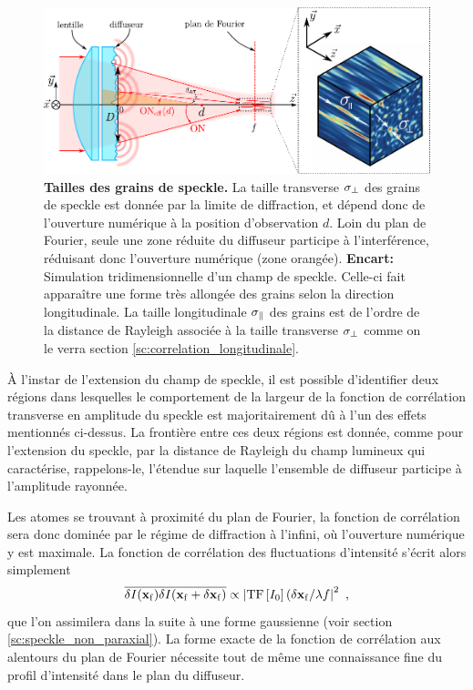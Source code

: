 \begin{figure}
\centering
\includegraphics[width=\textwidth]{Fig/Speckle/correlation_speckle.pdf}
\caption{\textbf{Tailles des grains de speckle.} La taille transverse $\sigma_{\perp}$ des grains de speckle est donnée par la limite de diffraction, et dépend donc de l'ouverture numérique à la position d'observation $d$. Loin du plan de Fourier, seule une zone réduite du diffuseur participe à l'interférence, réduisant donc l'ouverture numérique (zone orangée). \textbf{Encart:} Simulation tridimensionnelle d'un champ de speckle. Celle-ci fait apparaître une forme très allongée des grains selon la direction longitudinale. La taille longitudinale $\sigma_{\parallel}$ des grains est de l'ordre de la distance de Rayleigh associée à la taille transverse $\sigma_{\perp}$ comme on le verra section \ref{sc:correlation_longitudinale}.}
\label{fig:correlation_speckle}
\end{figure}

À l'instar de l'extension du champ de speckle, il est possible d'identifier deux régions dans lesquelles le comportement de la largeur de la fonction de corrélation transverse en amplitude du speckle est majoritairement dû à l'un des effets mentionnés ci-dessus. La frontière entre ces deux régions est donnée, comme pour l'extension du speckle, par la distance de Rayleigh du champ lumineux qui caractérise, rappelons-le, l'étendue sur laquelle l'ensemble de diffuseur participe à l'amplitude rayonnée.

Les atomes se trouvant à proximité du plan de Fourier, la fonction de corrélation sera donc dominée par le régime de diffraction à l'infini, où l'ouverture numérique y est maximale. La fonction de corrélation des fluctuations d'intensité s'écrit alors simplement
\begin{equation}
\overline{\delta I (\mathbf{x}_{\mathrm{f}}) \delta I (\mathbf{x}_{\mathrm{f}} + \delta \mathbf{x}_{\mathrm{f}})} \propto \left| \mathrm{TF} \left[ I_0 \right] (\delta \mathbf{x}_{\mathrm{f}} / \lambda f \right| ^2 \text{ ,}
\end{equation}
que l'on assimilera dans la suite à une forme gaussienne (voir section \ref{sc:speckle_non_paraxial}). La forme exacte de la fonction de corrélation aux alentours du plan de Fourier nécessite tout de même une connaissance fine du profil d'intensité dans le plan du diffuseur. 

